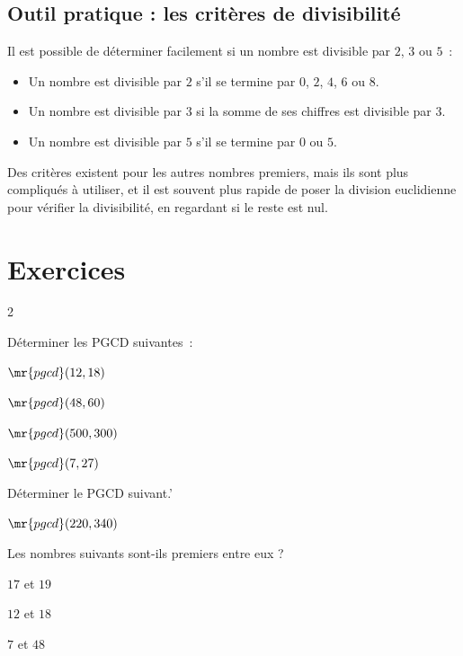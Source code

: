 \documentclass[12pt]{article}
\begin{document}
\subsection{Outil pratique : les critères de divisibilité}
Il est possible de déterminer facilement si un nombre est divisible par $2$, $3$ ou $5$~:
\begin{itemize}
    \item Un nombre est divisible par $2$ s'il se termine par $0$, $2$, $4$, $6$ ou $8$.
    \item Un nombre est divisible par $3$ si la somme de ses chiffres est divisible par $3$.
    \item Un nombre est divisible par $5$ s'il se termine par $0$ ou $5$.
\end{itemize}
Des critères existent pour les autres nombres premiers, mais ils sont plus compliqués à utiliser, et il est souvent plus rapide de poser la division euclidienne pour vérifier la divisibilité, en regardant si le reste est nul.

\section{Exercices}
\begin{multicols}{2}
    
\begin{exercice}{}{}
    Déterminer les PGCD suivantes~:
    \begin{enumeratebf}
        \item $\mr{pgcd}(12, 18)$
        \item $\mr{pgcd}(48, 60)$
        \item $\mr{pgcd}(500, 300)$
        \item $\mr{pgcd}(7, 27)$
    \end{enumeratebf}
\end{exercice}

\begin{exercice}{}{}
    Déterminer le PGCD suivant.'
    \begin{enumeratebf}
        \item $\mr{pgcd}(220, 340)$
        
    \end{enumeratebf}
\end{exercice}
\columnbreak
\begin{exercice}{}{}
    Les nombres suivants sont-ils premiers entre eux ?
    \begin{enumeratebf}
        \item $17$ et $19$
        \item $12$ et $18$
        \item $7$ et $48$
    \end{enumeratebf}
\end{exercice}
\end{multicols}
\end{document}
